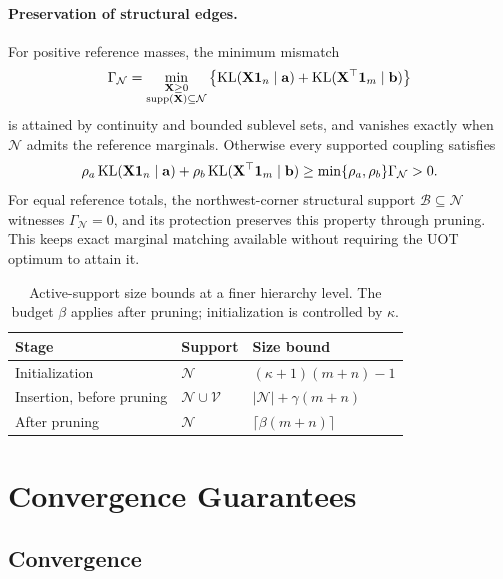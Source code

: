 \paragraph{Preservation of structural edges.}
\label{app:structural-mismatch}
For positive reference masses, the minimum mismatch
\begin{equation*}
\Gamma_{\mathcal N}=\min_{\substack{\mathbf X\geq0\\\operatorname{supp}(\mathbf X)\subseteq\mathcal N}}\left\{\operatorname{KL}(\mathbf X\mathbf1_n\mid\mathbf a)+\operatorname{KL}(\mathbf X^\top\mathbf1_m\mid\mathbf b)\right\}
\end{equation*}
is attained by continuity and bounded sublevel sets, and vanishes exactly when $\mathcal N$ admits the reference marginals.
Otherwise every supported coupling satisfies
\begin{equation*}
\rho_a\operatorname{KL}(\mathbf X\mathbf1_n\mid\mathbf a)+\rho_b\operatorname{KL}(\mathbf X^\top\mathbf1_m\mid\mathbf b)\geq\min\{\rho_a,\rho_b\}\Gamma_{\mathcal N}>0.
\end{equation*}
For equal reference totals, the northwest-corner structural support $\mathcal B\subseteq\mathcal N$ witnesses $\Gamma_{\mathcal N}=0$, and its protection preserves this property through pruning.
This keeps exact marginal matching available without requiring the UOT optimum to attain it.

\begin{table}[tb]
\centering
\caption{Active-support size bounds at a finer hierarchy level.
The budget $\beta$ applies after pruning; initialization is controlled by $\kappa$.}
\label{tab:support-size-bounds}
\footnotesize
\begin{tabular}{lll}
\toprule
Stage & Support & Size bound \\
\midrule
Initialization & $\mathcal N$ & $(\kappa+1)(m+n)-1$ \\
Insertion, before pruning & $\mathcal N\cup\mathcal V$ & $|\mathcal N|+\gamma(m+n)$ \\
After pruning & $\mathcal N$ & $\lceil\beta(m+n)\rceil$ \\
\bottomrule
\end{tabular}
\end{table}

\section{Convergence Guarantees}
\label{app:convergence-guarantees}

\subsection{\subsolver Convergence}
\label{app:pduot-convergence-proof}

